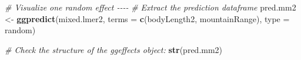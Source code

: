 \documentclass[
]{article}
\newenvironment{Shaded}{\begin{snugshade}}{\end{snugshade}}
\newcommand{\AttributeTok}[1]{\textcolor[rgb]{0.13,0.29,0.53}{#1}}
\newcommand{\CommentTok}[1]{\textcolor[rgb]{0.56,0.35,0.01}{\textit{#1}}}
\newcommand{\FunctionTok}[1]{\textcolor[rgb]{0.13,0.29,0.53}{\textbf{#1}}}
\newcommand{\NormalTok}[1]{#1}
\newcommand{\OtherTok}[1]{\textcolor[rgb]{0.56,0.35,0.01}{#1}}
\newcommand{\StringTok}[1]{\textcolor[rgb]{0.31,0.60,0.02}{#1}}
\begin{document}
\begin{Shaded}
\begin{Highlighting}[]
\CommentTok{\# Visualize one random effect {-}{-}{-}{-}}
\CommentTok{\# Extract the prediction dataframe}
\NormalTok{pred.mm2 }\OtherTok{\textless{}{-}} \FunctionTok{ggpredict}\NormalTok{(mixed.lmer2, }\AttributeTok{terms =} \FunctionTok{c}\NormalTok{(}\StringTok{\textquotesingle{}bodyLength2\textquotesingle{}}\NormalTok{, }\StringTok{\textquotesingle{}mountainRange\textquotesingle{}}\NormalTok{), }\AttributeTok{type =} \StringTok{\textquotesingle{}random\textquotesingle{}}\NormalTok{)}

\CommentTok{\# Check the structure of the ggeffects object:}
\FunctionTok{str}\NormalTok{(pred.mm2)}
\end{Highlighting}
\end{Shaded}
\end{document}
